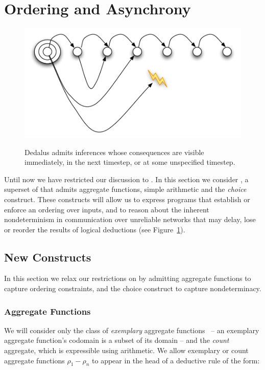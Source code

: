 \section{Ordering and Asynchrony}
\label{sec:async}

\begin{figure}[t]
  \centering
  \includegraphics[width=0.75\linewidth]{figures/dedalus-time.pdf}
  \label{fig:time}
   \caption{Dedalus admits inferences whose consequences are visible immediately, in the next timestep, or at some unspecified timestep.}
   
\vspace{-8pt}
\end{figure}

Until now we have restricted our discussion to \slang.  In this section we
consider \lang, a superset of \slang that admits aggregate functions, simple
arithmetic and the \emph{choice} construct.  These constructs will allow us to
express programs that establish or enforce an ordering over inputs, and to
reason about the inherent nondeterminism in communication over unreliable
networks that may delay, lose or reorder the results of logical deductions 
(see Figure~\ref{fig:time}).

\subsection{New Constructs}

In this section we relax our restrictions on \slang by admitting aggregate functions to 
capture ordering constraints, and the choice construct to capture nondeterminacy.

\subsubsection{Aggregate Functions}

We will consider only the class of \emph{exemplary} aggregate
functions~\cite{tag} -- an exemplary aggregate function's codomain is a subset
of its domain -- and the \emph{count} aggregate, which is expressible using
arithmetic.  We allow exemplary or count aggregate functions $\rho_1 - \rho_n$ to appear
in the head of a deductive rule of the form:

